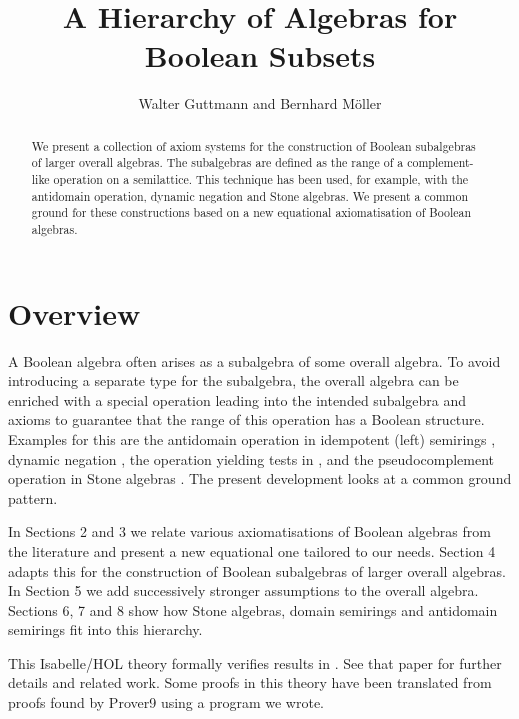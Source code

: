 \documentclass[11pt,a4paper]{article}
\begin{document}
\title{A Hierarchy of Algebras for Boolean Subsets}
\author{Walter Guttmann and Bernhard M\"oller}
\maketitle

\begin{abstract}
  We present a collection of axiom systems for the construction of Boolean subalgebras of larger overall algebras.
  The subalgebras are defined as the range of a complement-like operation on a semilattice.
  This technique has been used, for example, with the antidomain operation, dynamic negation and Stone algebras.
  We present a common ground for these constructions based on a new equational axiomatisation of Boolean algebras.
\end{abstract}

\tableofcontents

\section{Overview}

A Boolean algebra often arises as a subalgebra of some overall algebra.
To avoid introducing a separate type for the subalgebra, the overall algebra can be enriched with a special operation leading into the intended subalgebra and axioms to guarantee that the range of this operation has a Boolean structure.
Examples for this are the antidomain operation in idempotent (left) semirings \cite{DesharnaisStruth2008b,DesharnaisStruth2008a,DesharnaisStruth2011}, dynamic negation \cite{Hollenberg1997}, the operation yielding tests in \cite{Guttmann2012c,GuttmannStruthWeber2011b}, and the pseudocomplement operation in Stone algebras \cite{Frink1962,Graetzer1971,Guttmann2018c}.
The present development looks at a common ground pattern.

In Sections 2 and 3 we relate various axiomatisations of Boolean algebras from the literature and present a new equational one tailored to our needs.
Section 4 adapts this for the construction of Boolean subalgebras of larger overall algebras.
In Section 5 we add successively stronger assumptions to the overall algebra.
Sections 6, 7 and 8 show how Stone algebras, domain semirings and antidomain semirings fit into this hierarchy.

This Isabelle/HOL theory formally verifies results in \cite{GuttmannMoeller2020}.
See that paper for further details and related work.
Some proofs in this theory have been translated from proofs found by Prover9 \cite{McCune2010} using a program we wrote.

\begin{flushleft}

\end{flushleft}



\end{document}

